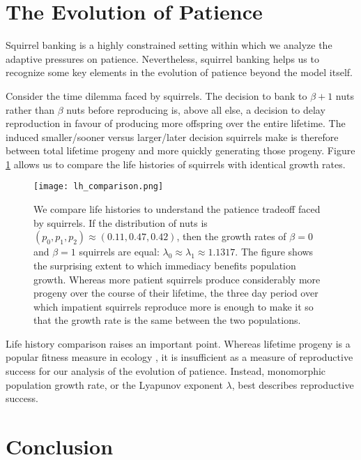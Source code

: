 \documentclass[titlepage, hidelinks, 12pt]{article}
\theoremstyle{plain}
\theoremstyle{remark}
\theoremstyle{definition}
\begin{document}
\section{The Evolution of Patience}
Squirrel banking is a highly constrained setting within which we analyze the adaptive pressures on patience.
Nevertheless, squirrel banking helps us to recognize some key elements in the evolution of patience beyond the model itself.

Consider the time dilemma faced by squirrels. The decision to bank to $\beta+1$ nuts rather than $\beta$ nuts before reproducing is,
above all else, a decision to delay reproduction in favour of producing more offspring over the entire lifetime. The induced smaller/sooner versus
larger/later decision squirrels make is therefore between total lifetime progeny and more quickly generating those progeny. Figure \ref{fig:lh_comparison}
allows us to compare the life histories of squirrels with identical growth rates. 



\begin{figure}[h]
    \centering
    \texttt{[image: lh\_comparison.png]}
    \caption[Life histories of patient and impulsive squirrels.]{We compare life histories to understand the patience tradeoff faced by squirrels. If the distribution of nuts
    is $(p_0, p_1, p_2) \approx (0.11, 0.47, 0.42)$, then the growth rates of $\beta = 0$ and $\beta = 1$ squirrels are
equal: $\lambda_0 \approx \lambda_1 \approx 1.1317$. The figure shows the surprising extent to which immediacy benefits population
growth. Whereas more patient squirrels produce considerably more progeny over the course of their lifetime, the three day period over which
impatient squirrels reproduce more is enough to make it so that the growth rate is the same between the two populations.}
    \label{fig:lh_comparison}
\end{figure}

Life history comparison raises an important point. Whereas lifetime progeny is a popular fitness measure in ecology \cite{stearns92}, it is
insufficient as a measure of reproductive success for our analysis of the evolution of patience. Instead, monomorphic population growth rate,
or the Lyapunov exponent $\lambda$, best describes reproductive success. 





\section{Conclusion}
\end{document}
